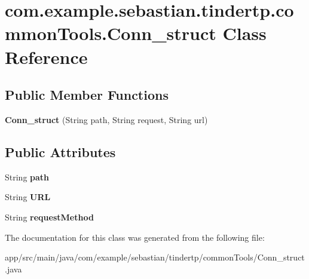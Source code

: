 \hypertarget{classcom_1_1example_1_1sebastian_1_1tindertp_1_1commonTools_1_1Conn__struct}{}\section{com.\+example.\+sebastian.\+tindertp.\+common\+Tools.\+Conn\+\_\+struct Class Reference}
\label{classcom_1_1example_1_1sebastian_1_1tindertp_1_1commonTools_1_1Conn__struct}
\subsection*{Public Member Functions}
\begin{DoxyCompactItemize}
\item 
{\bfseries Conn\+\_\+struct} (String path, String request, String url)\hypertarget{classcom_1_1example_1_1sebastian_1_1tindertp_1_1commonTools_1_1Conn__struct_a46530a3d811fadcec1ba369aeb0440a4}{}\label{classcom_1_1example_1_1sebastian_1_1tindertp_1_1commonTools_1_1Conn__struct_a46530a3d811fadcec1ba369aeb0440a4}

\end{DoxyCompactItemize}
\subsection*{Public Attributes}
\begin{DoxyCompactItemize}
\item 
String {\bfseries path}\hypertarget{classcom_1_1example_1_1sebastian_1_1tindertp_1_1commonTools_1_1Conn__struct_aa45da2cb31d20b7452f45f61349263c8}{}\label{classcom_1_1example_1_1sebastian_1_1tindertp_1_1commonTools_1_1Conn__struct_aa45da2cb31d20b7452f45f61349263c8}

\item 
String {\bfseries U\+RL}\hypertarget{classcom_1_1example_1_1sebastian_1_1tindertp_1_1commonTools_1_1Conn__struct_ad950f5efb8989af668b84ee9525a7206}{}\label{classcom_1_1example_1_1sebastian_1_1tindertp_1_1commonTools_1_1Conn__struct_ad950f5efb8989af668b84ee9525a7206}

\item 
String {\bfseries request\+Method}\hypertarget{classcom_1_1example_1_1sebastian_1_1tindertp_1_1commonTools_1_1Conn__struct_a144d28d381117cc617548b85358a7e7d}{}\label{classcom_1_1example_1_1sebastian_1_1tindertp_1_1commonTools_1_1Conn__struct_a144d28d381117cc617548b85358a7e7d}

\end{DoxyCompactItemize}


The documentation for this class was generated from the following file\+:\begin{DoxyCompactItemize}
\item 
app/src/main/java/com/example/sebastian/tindertp/common\+Tools/Conn\+\_\+struct.\+java\end{DoxyCompactItemize}
